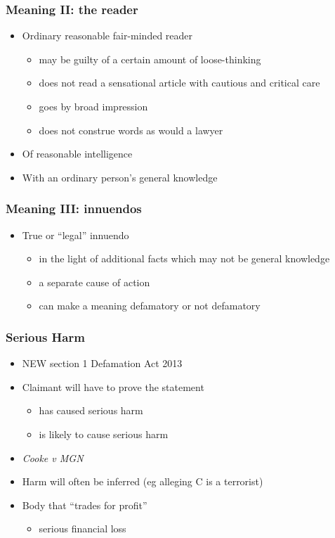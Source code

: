 \documentclass[ignorenonframetext,]{beamer}
\begin{document}
\begin{frame}
\frametitle{Meaning II: the reader}


\begin{itemize}
  \item  Ordinary reasonable fair-minded reader

    \begin{itemize}
    \item may be guilty of a certain amount of loose-thinking
    \item does not read a sensational article with cautious and critical care
    \item goes by broad impression
    \item does not construe words as would a lawyer
    \end{itemize}
  \item  Of reasonable intelligence
  \item  With an ordinary person's general knowledge
  \end{itemize}


\end{frame}

\begin{frame}
\frametitle{Meaning III: innuendos}

\begin{itemize}
\item  True or ``legal'' innuendo

  \begin{itemize}
  \item in the light of additional facts which may not be general knowledge
  \item a separate cause of action
  \item can make a meaning defamatory or not defamatory
  \end{itemize}
\end{itemize}
\end{frame}

\begin{frame}
  \frametitle{Serious Harm}
  \begin{itemize}
  \item NEW section 1 Defamation Act 2013
  \item Claimant will have to prove the statement
    \begin{itemize}
    \item has caused serious harm
    \item is likely to cause serious harm
    \end{itemize}
  \item {\it Cooke v MGN}
  \item Harm will often be inferred (eg alleging C is a terrorist)
  \item Body that ``trades for profit''
    \begin{itemize}
    \item serious financial loss
    \end{itemize}
  \end{itemize}
\end{frame}
\end{document}
